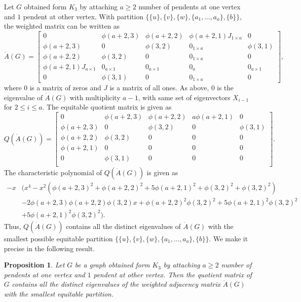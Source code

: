 \documentclass[12pt,twoside]{article}
\newtheorem{proposition}[theorem]{Proposition}
\begin{document}
Let $G$ obtained form $K_{3}$ by attaching $a\geq 2$ number of pendents at one vertex and $1$ pendent at other vertex. With partition $\{\{u\},\{v\},\{w\}, \{a_{1},\dots,a_{a}\},\{b\}\}$, the weighted matrix can be written as
$$ \dot{A}(G)=\begin{bmatrix}
	0 & \phi(a+2,3) & \phi(a+2,2) & \phi(a+2,1)J_{1\times a} & 0\\
	\phi(a+2,3) & 0 & \phi(3,2) & 0_{1\times a} & \phi(3,1)\\
	\phi(a+2,2) & \phi(3,2) & 0 & 0_{1\times a} & 0\\
	\phi(a+2,1)J_{a\times 1} & 0_{a\times 1} & 0_{a\times 1} & 0_{a} & 0_{a\times 1}\\
	0 & \phi(3,1) & 0 & 0_{1\times a} & 0
\end{bmatrix}, $$
where $0$ is a matrix of zeros and $J$ is a matrix of all ones. As above, $0$ is the eigenvalue of $\dot{A}(G)$ with multiplicity $a-1$, with same set of eigenvectors $X_{i-1}$ for $2\leq i\leq a$. The equitable quotient matrix is given as
 $$ Q(\dot{A}(G))=\left[
 \begin{array}{ccccc}
 	0 & \phi(a+2,3) & \phi(a+2,2) & a \phi(a+2,1) & 0 \\
 	\phi(a+2,3) & 0 & \phi(3,2) & 0 & \phi(3,1) \\
 	\phi(a+2,2) & \phi(3,2) & 0 & 0 & 0 \\
 	\phi(a+2,1) & 0 & 0 & 0 & 0 \\
 	0 & \phi(3,1) & 0 & 0 & 0 \\
 \end{array}
 \right]. $$
 The characteristic polynomial of $ Q(\dot{A}(G))$ is given as
 \begin{align*}
 	-x&\Big(x^{4}-x^2 \left(\phi(a+2,3)^2+\phi(a+2,2)^2+5 \phi(a+2,1)^2+\phi(3,2)^2+\phi(3,2)^2\right)\\
 	&-2 \phi(a+2,3) \phi(a+2,2) \phi(3,2) x+\phi(a+2,2)^2 \phi(3,2)^2+5 \phi(a+2,1)^2 \phi(3,2)^2\\
 	&+5 \phi(a+2,1)^2 \phi(3,2)^2\Big).
 \end{align*} Thus, $Q(\dot{A}(G))$ contains all the distinct eigenvalues of $ \dot{A}(G)$ with the smallest possible equitable partition $\{\{u\},\{v\},\{w\}, \{a_{1},\dots,a_{a}\},\{b\}\}$. We make it precise in the following result. 
 \begin{proposition}\label{rare graph unicyclic}
 	Let $G$ be a graph obtained form $K_{3}$ by attaching $a\geq 2$ number of pendents at one vertex and $1$ pendent at other vertex. Then the quotient matrix of $G$ contains all the distinct eigenvalues of the weighted adjacency matrix $\dot{A}(G)$ with the smallest equitable partition.
 \end{proposition}
 
\end{document}
